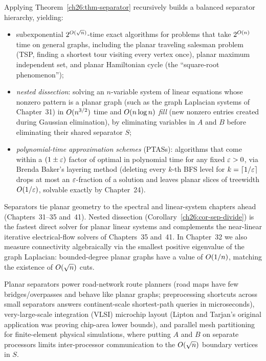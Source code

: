 \begin{corollary}
\label{ch26:cor-sep-divide}
Applying Theorem~\ref{ch26:thm-separator} recursively builds a balanced separator hierarchy,
yielding:
\begin{itemize}
  \item subexponential $2^{O(\sqrt n)}$-time exact algorithms for problems that take
        $2^{O(n)}$ time on general graphs, including the planar traveling salesman problem
        (TSP, finding a shortest tour visiting every vertex once), planar maximum
        independent set, and planar Hamiltonian cycle (the ``square-root phenomenon'');
  \item \emph{nested dissection}: solving an $n$-variable system of linear equations whose
        nonzero pattern is a planar graph (such as the graph Laplacian systems of
        Chapter~31) in $O(n^{3/2})$ time and $O(n\log n)$ \emph{fill} (new nonzero
        entries created during Gaussian elimination), by eliminating variables in $A$ and $B$
        before eliminating their shared separator $S$;
  \item \emph{polynomial-time approximation schemes} (PTASs): algorithms that come within a
        $(1\pm\varepsilon)$ factor of optimal in polynomial time for any fixed $\varepsilon>0$, via Brenda
        Baker's layering method (deleting every $k$-th BFS level for $k = \lceil1/\varepsilon\rceil$
        drops at most an $\varepsilon$-fraction of a solution and leaves planar slices of treewidth
        $O(1/\varepsilon)$, solvable exactly by Chapter~24).
\end{itemize}
\end{corollary}

\begin{connectionbox}
Separators tie planar geometry to the spectral and linear-system chapters ahead
(Chapters~31--35 and~41). Nested dissection (Corollary~\ref{ch26:cor-sep-divide}) is the
fastest direct solver for planar linear systems and complements the near-linear iterative
electrical-flow solvers of Chapters~35 and~41. In Chapter~32 we also measure connectivity
algebraically via the smallest positive eigenvalue of the graph Laplacian: bounded-degree
planar graphs have a value of $O(1/n)$, matching the existence of $O(\sqrt n)$ cuts.
\end{connectionbox}

\begin{applicationbox}
Planar separators power road-network route planners (road maps have few bridges/overpasses
and behave like planar graphs; preprocessing shortcuts across small separators answers
continent-scale shortest-path queries in microseconds), very-large-scale integration (VLSI)
microchip layout (Lipton and Tarjan's original application was proving chip-area lower
bounds), and parallel mesh partitioning for finite-element physical simulations, where
putting $A$ and $B$ on separate processors limits inter-processor communication to the
$O(\sqrt n)$ boundary vertices in $S$.
\end{applicationbox}

